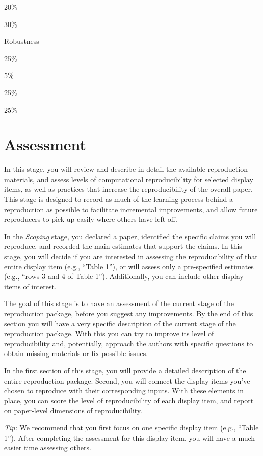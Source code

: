 \documentclass[]{book}
\begin{document}
20\%

30\%

Robustness

25\%

5\%

25\%

25\%

\hypertarget{assessment}{%
\chapter{Assessment}\label{assessment}}

In this stage, you will review and describe in detail the available reproduction materials, and assess levels of computational reproducibility for selected display items, as well as practices that increase the reproducibility of the overall paper. This stage is designed to record as much of the learning process behind a reproduction as possible to facilitate incremental improvements, and allow future reproducers to pick up easily where others have left off.

In the \emph{Scoping} stage, you declared a paper, identified the specific claims you will reproduce, and recorded the main estimates that support the claims. In this stage, you will decide if you are interested in assessing the reproducibility of that entire display item (e.g., ``Table 1''), or will assess only a pre-specified estimates (e.g., ``rows 3 and 4 of Table 1''). Additionally, you can include other display items of interest.

The goal of this stage is to have an assessment of the current stage of the reproduction package, before you suggest any improvements. By the end of this section you will have a very specific description of the current stage of the reproduction package. With this you can try to improve its level of reproducibility and, potentially, approach the authors with specific questions to obtain missing materials or fix possible issues.

In the first section of this stage, you will provide a detailed description of the entire reproduction package. Second, you will connect the display items you've chosen to reproduce with their corresponding inputs. With these elements in place, you can score the level of reproducibility of each display item, and report on paper-level dimensions of reproducibility.

\emph{Tip:} We recommend that you first focus on one specific display item (e.g., ``Table 1''). After completing the assessment for this display item, you will have a much easier time assessing others.
\end{document}
